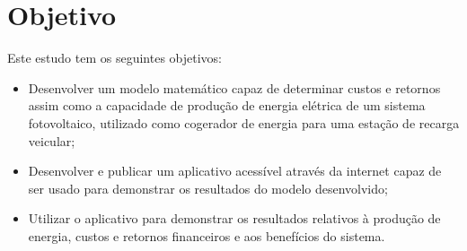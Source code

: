 \section{Objetivo}\label{Objetivo}

Este estudo tem os seguintes objetivos:
\begin{itemize}

    \item Desenvolver um modelo matemático capaz de determinar custos e retornos assim como a capacidade de produção de energia elétrica de um sistema fotovoltaico, utilizado como cogerador de energia para uma estação de recarga veicular;
    
    \item Desenvolver e publicar um aplicativo acessível através da internet capaz de ser usado para demonstrar os resultados do modelo desenvolvido;
    
    \item Utilizar o aplicativo para demonstrar os resultados relativos à produção de energia, custos e retornos financeiros e aos benefícios do sistema.
  
\end{itemize}